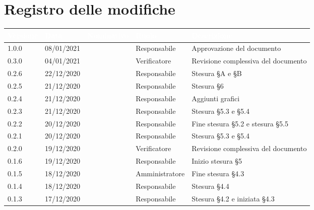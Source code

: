 \section*{Registro delle modifiche}
{
\renewcommand{\arraystretch}{1.5}
\centering
\begin{longtable}{C{2cm} C{2.5cm} C{3cm} C{2.5cm} C{5cm}}
\textcolor{white}{\textbf{Versione}}&
\textcolor{white}{\textbf{Data}}&
\textcolor{white}{\textbf{Nominativo}}&
\textcolor{white}{\textbf{Ruolo}}&
\textcolor{white}{\textbf{Descrizione}}\\	
\endhead

1.0.0 & 08/01/2021 & \SG{} & Responsabile & Approvazione del documento \\

0.3.0 & 04/01/2021 & \SH{} & Verificatore & Revisione complessiva del documento \\

0.2.6 & 22/12/2020 & \BM{} & Responsabile & Stesura \S A e \S B \\

0.2.5 & 21/12/2020 & \BM{} & Responsabile & Stesura \S 6\\

0.2.4 & 21/12/2020 & \SG{} & Responsabile & Aggiunti grafici \\

0.2.3 & 21/12/2020 & \BM{} & Responsabile & Stesura \S 5.3 e \S 5.4\\

0.2.2 & 20/12/2020 & \SG{} & Responsabile & Fine stesura \S 5.2 e stesura \S 5.5 \\

0.2.1 & 20/12/2020 & \BM{} & Responsabile & Stesura \S 5.3 e \S 5.4\\

0.2.0 & 19/12/2020 & \ZM{} & Verificatore & Revisione complessiva del documento \\

0.1.6 & 19/12/2020 & \SG{} & Responsabile & Inizio stesura \S 5 \\

0.1.5 & 18/12/2020 & \PA{} & Amministratore & Fine stesura \S 4.3\\

0.1.4 & 18/12/2020 & \SG{} & Responsabile & Stesura \S 4.4 \\

0.1.3 & 17/12/2020 & \BM{} & Responsabile & Stesura \S 4.2 e iniziata \S 4.3 \\


\end{longtable}}
